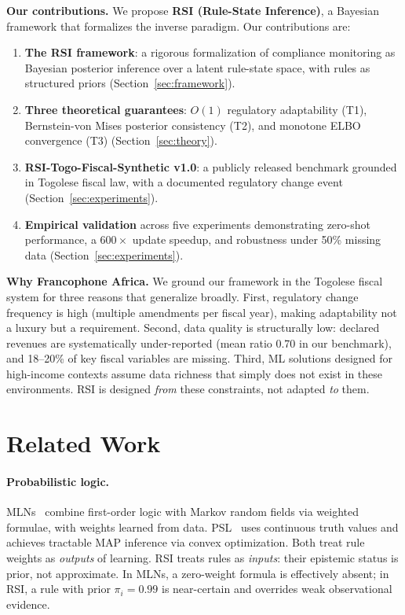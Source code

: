 \documentclass[letterpaper]{article}
\begin{document}
\medskip
\noindent\textbf{Our contributions.}
We propose \textbf{RSI (Rule-State Inference)}, a Bayesian framework
that formalizes the inverse paradigm. Our contributions are:
\begin{enumerate}[leftmargin=2em, label=(\arabic*)]
  \item \textbf{The RSI framework}: a rigorous formalization of
        compliance monitoring as Bayesian posterior inference over a
        latent rule-state space, with rules as structured priors
        (Section~\ref{sec:framework}).
  \item \textbf{Three theoretical guarantees}: $O(1)$ regulatory
        adaptability (T1), Bernstein-von Mises posterior consistency
        (T2), and monotone ELBO convergence (T3)
        (Section~\ref{sec:theory}).
  \item \textbf{RSI-Togo-Fiscal-Synthetic v1.0}: a publicly released
        benchmark grounded in Togolese fiscal law, with a documented
        regulatory change event (Section~\ref{sec:experiments}).
  \item \textbf{Empirical validation} across five experiments
        demonstrating zero-shot performance, a $600\times$ update
        speedup, and robustness under 50\% missing data
        (Section~\ref{sec:experiments}).
\end{enumerate}

\medskip
\noindent\textbf{Why Francophone Africa.}
We ground our framework in the Togolese fiscal system for three reasons
that generalize broadly. First, regulatory change frequency is high
(multiple amendments per fiscal year), making adaptability not a luxury
but a requirement. Second, data quality is structurally low: declared
revenues are systematically under-reported (mean ratio 0.70 in our
benchmark), and 18--20\% of key fiscal variables are missing. Third,
ML solutions designed for high-income contexts assume data richness
that simply does not exist in these environments. RSI is designed
\emph{from} these constraints, not adapted \emph{to} them.

\section{Related Work}
\label{sec:related}

\paragraph{Probabilistic logic.}
MLNs~\citep{richardson2006markov} combine first-order logic with Markov
random fields via weighted formulae, with weights learned from data.
PSL~\citep{bach2017hinge} uses continuous truth values and achieves
tractable MAP inference via convex optimization. Both treat rule weights
as \emph{outputs} of learning. RSI treats rules as \emph{inputs}: their
epistemic status is prior, not approximate. In MLNs, a zero-weight
formula is effectively absent; in RSI, a rule with prior $\pi_i = 0.99$
is near-certain and overrides weak observational evidence.
\end{document}
